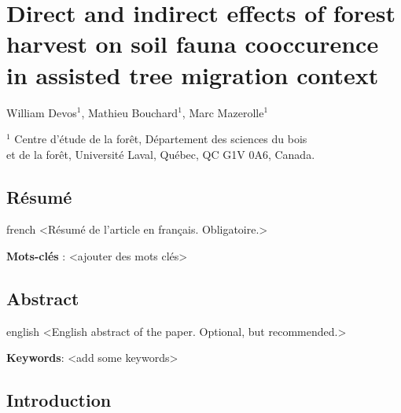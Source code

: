 \chapter{Direct and indirect effects of forest harvest on soil fauna cooccurence in assisted tree migration context}     %
\label{chapitre1-articles}    

William Devos$^1$, Mathieu Bouchard$^1$, Marc Mazerolle$^1$

$^1$ Centre d'étude de la forêt, Département des sciences du bois \\ 
et de la forêt, Université Laval, Québec, QC G1V 0A6, Canada. \\ 

\clearpage

\section*{Résumé}
\label{sec:resume1}

\begin{otherlanguage*}{french}
  <Résumé de l'article en français. Obligatoire.>

  \textbf{Mots-clés} : <ajouter des mots clés>
\end{otherlanguage*}

\clearpage

\section*{Abstract}
\label{sec:abstract1}

\begin{otherlanguage*}{english}
  <English abstract of the paper. Optional, but recommended.>

\textbf{Keywords}: <add some keywords> 
\end{otherlanguage*}

\cleardoublepage

\section*{Introduction}
\label{sec:intro1}


